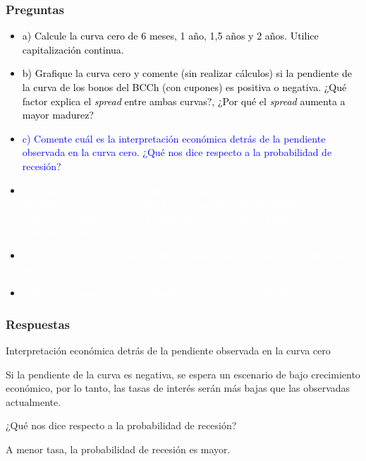 \documentclass{beamer}
\newif\ifpresentacion
\newcommand{\pausa}{\ifpresentacion\pause\fi}
\begin{document}
\begin{frame}
  \frametitle{Preguntas}
  \begin{itemize}
    \scriptsize
    \item {\textcolor{black}{a) Calcule la curva cero de 6 meses, 1 año, 1,5 años y 2 años. Utilice capitalización continua.}}
    \vspace{3pt}
    \item {\textcolor{black}{b) Grafique la curva cero y comente (sin realizar cálculos) si la pendiente de la curva de los bonos del BCCh (con cupones) es positiva o negativa. ¿Qué factor explica el \textit{spread} entre ambas curvas?, ¿Por qué el \textit{spread} aumenta a mayor madurez?}}
    \vspace{3pt}
    \item {\Large\textcolor{blue}{c) Comente cuál es la interpretación económica detrás de la pendiente observada en la curva cero. 
    ¿Qué nos dice respecto a la probabilidad de recesión?}}
    \vspace{3pt}
    \item {\textcolor{white}{d) Considerando que usted tiene la información de la curva cero, la curva \textit{forward} y la curva de las \textit{yields} de los bonos de gobierno. Señale qué curva usaría para calcular el valor presente de las ganancias o pérdidas de los contratos \textit{forward}.}}
    \vspace{3pt}
    \item {\textcolor{white}{e) ¿Cuál es el rol de las probabilidades neutrales al riesgo en d)?, ¿Qué rol juega la condición de no arbitraje?}}
    \vspace{3pt}
    \item {\textcolor{white}{f) Realice el punto a) y b)  utilizando matrices en Excel/R/Python.}}
    \vspace{3pt}
  \end{itemize}
\end{frame}

\begin{frame}
  \frametitle{Respuestas }
  \begin{block}{Interpretación económica detrás de la pendiente observada en la curva cero}
    \pausa
    Si la pendiente de la curva es negativa, se espera un escenario de bajo crecimiento
    económico, por lo tanto, las tasas de interés serán más bajas que las observadas
    actualmente.
  \end{block}
  \pausa
  \begin{block}{¿Qué nos dice respecto a la probabilidad de recesión?}
    \pausa
  A menor tasa, la probabilidad de recesión es mayor. 
  \end{block}
\end{frame}
\end{document}
